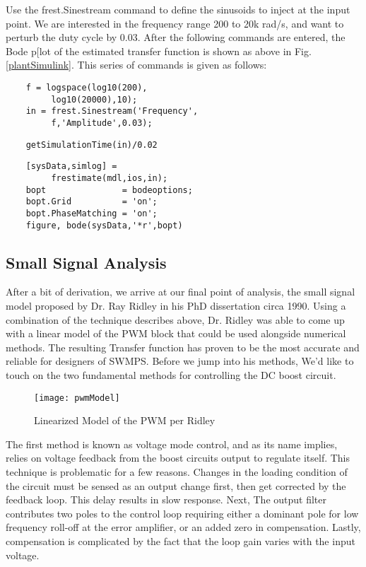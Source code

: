 Use the frest.Sinestream command to define the sinusoids to inject at the input point. We are interested in the frequency range 200 to 20k rad/s, and want to perturb the duty cycle by 0.03. After the following commands are entered, the Bode p[lot of the estimated transfer function is shown as above in Fig. \ref{plantSimulink}. This series of commands is given as follows:

\begin{verbatim}
	f = logspace(log10(200),
         log10(20000),10);
	in = frest.Sinestream('Frequency',
         f,'Amplitude',0.03);
\end{verbatim}

\begin{verbatim}
	getSimulationTime(in)/0.02
\end{verbatim}

\begin{verbatim}
	[sysData,simlog] = 
         frestimate(mdl,ios,in);
	bopt               = bodeoptions;
	bopt.Grid          = 'on';
	bopt.PhaseMatching = 'on';
	figure, bode(sysData,'*r',bopt)
\end{verbatim}

\subsection{Small Signal Analysis}
After a bit of derivation, we arrive at our final point of analysis, the small signal model proposed by Dr. Ray Ridley in his PhD dissertation circa 1990. Using a combination of the technique describes above, Dr. Ridley was able to come up with a linear model of the PWM block that could be used alongside numerical methods. The resulting Transfer function has proven to be the most accurate and reliable for designers of SWMPS. Before we jump into his methods, We'd like to touch on the two fundamental methods for controlling the DC boost circuit.
 
\begin{figure}[htbp]
\begin{center}
\texttt{[image: pwmModel]}
\caption{Linearized Model of the PWM per Ridley\cite{ridley}}
\label{pwmModel}
\end{center}
\end{figure}

The first method is known as voltage mode control, and as its name implies, relies on voltage feedback from the boost circuits output to regulate itself. This technique is problematic for a few reasons. Changes in the loading condition of the circuit must be sensed as an output change first, then get corrected by the feedback loop. This delay results in slow response. Next, The output filter contributes two poles to the control loop requiring either a dominant pole for low frequency roll-off at the error amplifier, or an added zero in compensation.
Lastly, compensation is complicated by the fact that the loop gain varies with the input voltage.

